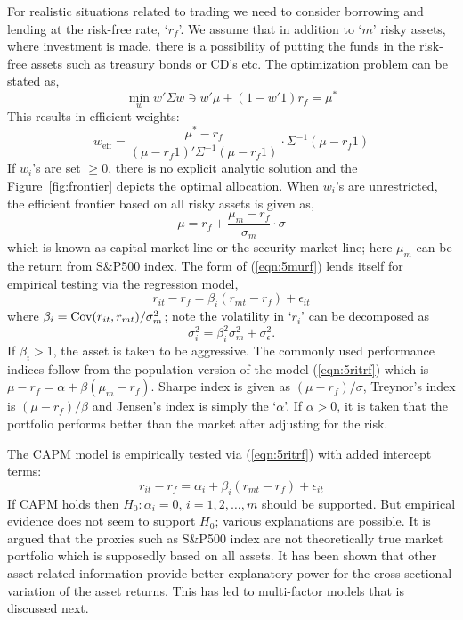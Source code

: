 For realistic situations related to trading we need to consider borrowing and lending at the risk-free rate, `$r_f$'. We assume that in addition to `$m$' risky assets, where investment is made, there is a possibility of putting the funds in the risk-free assets such as treasury bonds or CD's etc. The optimization problem can be stated as,
	\begin{equation}\label{eqn:5min2}
	\min_w w' \Sigma w \ni w'\mu + (1-w'1) r_f = \mu^*
	\end{equation}
This results in efficient weights:
	\begin{equation}\label{eqn:5weff2}
	w_{\text{eff}}= \dfrac{\mu^* - r_f}{(\mu - r_f1)' \Sigma^{-1}(\mu - r_f 1)} \cdot \Sigma^{-1}(\mu - r_f1)
	\end{equation}
If $w_i$'s are set $\geq 0$, there is no explicit analytic solution and the Figure~\ref{fig:frontier} depicts the optimal allocation. When $w_i$'s are unrestricted, the efficient frontier based on all risky assets is given as, 
	\begin{equation}\label{eqn:5murf}
	\mu= r_f + \dfrac{\mu_m - r_f}{\sigma_m} \cdot \sigma
	\end{equation}
which is known as capital market line or the security market line; here $\mu_m$ can be the return from S\&P500 index. The form of (\ref{eqn:5murf}) lends itself for empirical testing via the regression model,
	\begin{equation}\label{eqn:5ritrf}
	r_{it} - r_f = \beta_i (r_{mt} - r_f) + \epsilon_{it}
	\end{equation}
where $\beta_i=\operatorname{Cov}(r_{it},r_{mt})/\sigma_m^2$; note the volatility in `$r_i$' can be decomposed as 
	\begin{equation}\label{eqn:5sigsq}
	\sigma_i^2= \beta_i^2 \sigma_m^2 + \sigma_\epsilon^2.
	\end{equation}
If $\beta_i>1$, the asset is taken to be aggressive. The commonly used performance indices follow from the population version of the model (\ref{eqn:5ritrf}) which is $\mu - r_f = \alpha + \beta(\mu_m - r_f)$. Sharpe index is given as $(\mu- r_f)/\sigma$, Treynor's index is $(\mu- r_f)/\beta$ and Jensen's index is simply the `$\alpha$'. If $\alpha>0$, it is taken that the portfolio performs better than the market after adjusting for the risk. 


The CAPM model is empirically tested via (\ref{eqn:5ritrf}) with added intercept terms:
	\begin{equation}\label{eqn:intercept}
	r_{it} - r_f = \alpha_i + \beta_i (r_{mt} - r_f) + \epsilon_{it}
	\end{equation}
If CAPM holds then $H_0: \alpha_i=0$, $i=1,2,\ldots,m$ should be supported. But empirical evidence does not seem to support $H_0$; various explanations are possible. It is argued that the proxies such as S\&P500 index are not theoretically true market portfolio which is supposedly based on all assets. It has been shown that other asset related information provide better explanatory power for the cross-sectional variation of the asset returns. This has led to multi-factor models that is discussed next. 


